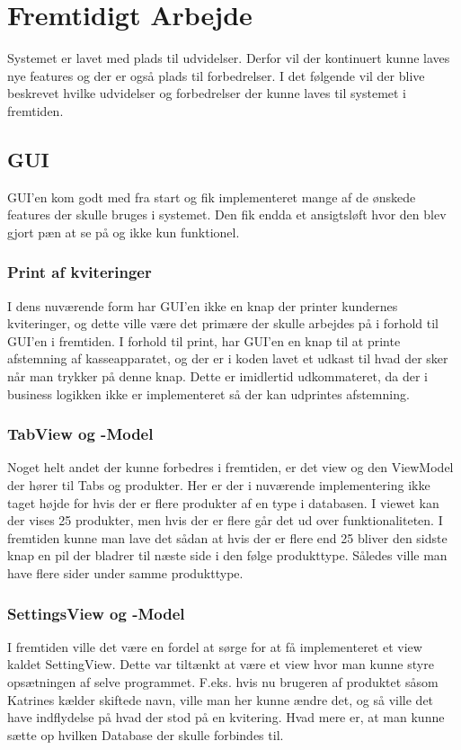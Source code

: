 \section{Fremtidigt Arbejde}
Systemet er lavet med plads til udvidelser. Derfor vil der kontinuert kunne laves nye features og der er også plads til forbedrelser. I det følgende vil der blive beskrevet hvilke udvidelser og forbedrelser der kunne laves til systemet i fremtiden. 

\subsection{GUI}
GUI'en kom godt med fra start og fik implementeret mange af de ønskede features der skulle bruges i systemet. Den fik endda et ansigtsløft hvor den blev gjort pæn at se på og ikke kun funktionel.\newline 
\subsubsection{Print af kviteringer}
I dens nuværende form har GUI'en ikke en knap der printer kundernes kviteringer, og dette ville være det primære der skulle arbejdes på i forhold til GUI'en i fremtiden. I forhold til print, har GUI'en en knap til at printe afstemning af kasseapparatet, og der er i koden lavet et udkast til hvad der sker når man trykker på denne knap. Dette er imidlertid udkommateret, da der i business logikken ikke er implementeret så der kan udprintes afstemning.\newline
\subsubsection{TabView og -Model}
Noget helt andet der kunne forbedres i fremtiden, er det view og den ViewModel der hører til Tabs og produkter. Her er der i nuværende implementering ikke taget højde for hvis der er flere produkter af en type i databasen. I viewet kan der vises 25 produkter, men hvis der er flere går det ud over funktionaliteten. I fremtiden kunne man lave det sådan at hvis der er flere end 25 bliver den sidste knap en pil der bladrer til næste side i den følge produkttype. Således ville man have flere sider under samme produkttype.\newline
\subsubsection{SettingsView og -Model}
I fremtiden ville det være en fordel at sørge for at få implementeret et view kaldet SettingView. Dette var tiltænkt at være et view hvor man kunne styre opsætningen af selve programmet. F.eks. hvis nu brugeren af produktet såsom Katrines kælder skiftede navn, ville man her kunne ændre det, og så ville det have indflydelse på hvad der stod på en kvitering. Hvad mere er, at man kunne sætte op hvilken Database der skulle forbindes til. 

